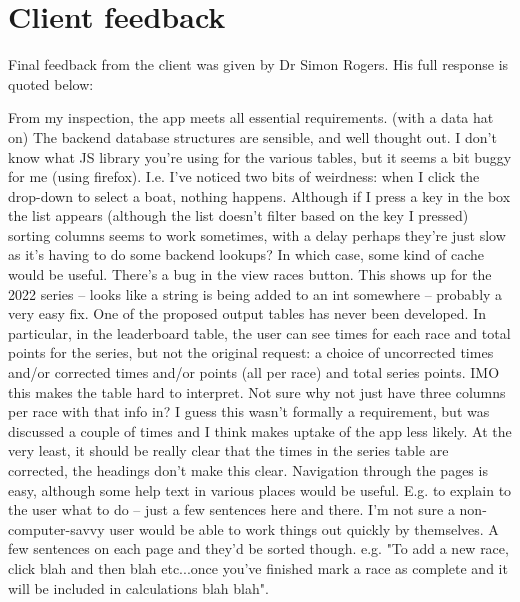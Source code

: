 \documentclass{l4proj}
\begin{document}
\section{Client feedback}

Final feedback from the client was given by Dr Simon Rogers. His full response is quoted below:

\begin{displayquote}
    \begin{outline}
        \1 
        From my inspection, the app meets all essential requirements.
        \1
        (with a data hat on) The backend database structures are sensible, and well thought out.
        \1
        I don't know what JS library you're using for the various tables, but it seems a bit buggy for me (using firefox). I.e. I've noticed two bits of weirdness:
            \2 
            when I click the drop-down to select a boat, nothing happens. Although if I press a key in the box the list appears (although the list doesn't filter based on the key I pressed)
            \2
            sorting columns seems to work sometimes, with a delay
        perhaps they're just slow as it's having to do some backend lookups? In which case, some kind of cache would be useful.
        \1 
        There's a bug in the view races button. This shows up for the 2022 series -- looks like a string is being added to an int somewhere -- probably a very easy fix.
        \1 
        One of the proposed output tables has never been developed. In particular, in the leaderboard table, the user can see times for each race and total points for the series, but not the original request: a choice of uncorrected times and/or corrected times and/or points (all per race) and total series points. IMO this makes the table hard to interpret. Not sure why not just have three columns per race with that info in? I guess this wasn't formally a requirement, but was discussed a couple of times and I think makes uptake of the app less likely. At the very least, it should be really clear that the times in the series table are corrected, the headings don't make this clear.
        \1 
        Navigation through the pages is easy, although some help text in various places would be useful. E.g. to explain to the user what to do -- just a few sentences here and there. I'm not sure a non-computer-savvy user would be able to work things out quickly by themselves. A few sentences on each page and they'd be sorted though. e.g. "To add a new race, click blah and then blah etc...once you've finished mark a race as complete and it will be included in calculations blah blah".

\end{outline}
\end{displayquote}
\end{document}
